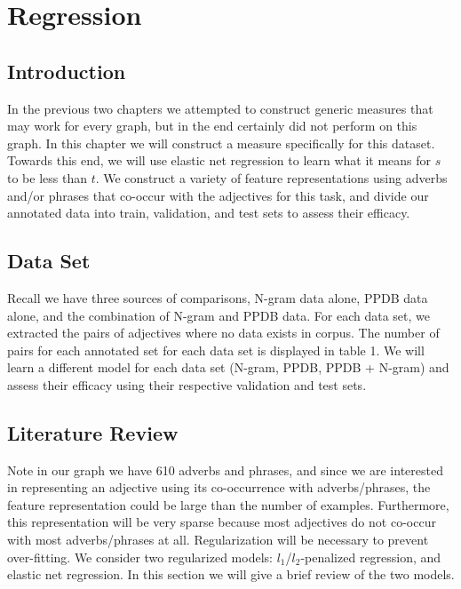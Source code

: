\section{Regression}

\subsection{Introduction}

In the previous two chapters we attempted to construct generic measures that may work for every graph, but in the end certainly did not perform on this graph. In this chapter we will construct a measure specifically for this dataset. Towards this end, we will use elastic net regression to learn what it means for $s$ to be less than $t$. We construct a variety of feature representations using adverbs and/or phrases that co-occur with the adjectives for this task, and divide our annotated data into train, validation, and test sets to assess their efficacy. 

\subsection{Data Set}

Recall we have three sources of comparisons, N-gram data alone, PPDB data alone, and the combination of N-gram and PPDB data. For each data set, we extracted the pairs of adjectives where no data exists in corpus. The number of pairs for each annotated set for each data set is displayed in table 1. We will learn a different model for each data set (N-gram, PPDB, PPDB + N-gram) and assess their efficacy using their respective validation and test sets. 

\subsection{Literature Review}

Note in our graph we have 610 adverbs and phrases, and since we are interested in representing an adjective using its co-occurrence with adverbs/phrases, the feature representation could be large than the number of examples. Furthermore, this representation will be very sparse because most adjectives do not co-occur with most adverbs/phrases at all. Regularization will be necessary to prevent over-fitting. We consider two regularized models: $l_1$/$l_2$-penalized regression, and elastic net regression. In this section we will give a brief review of the two models.

